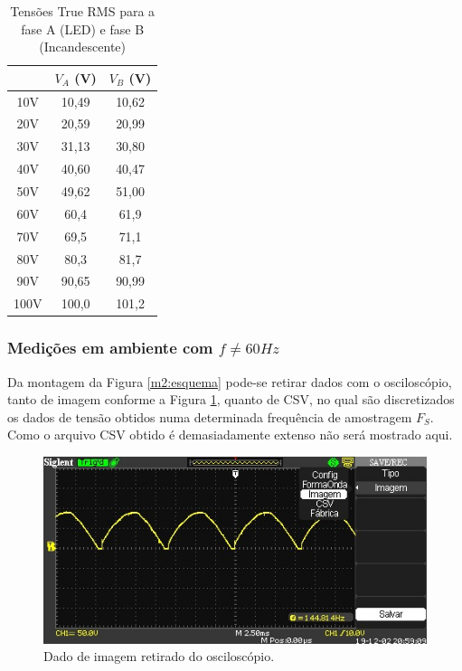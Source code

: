 \documentclass[a4paper,12pt,oneside,openany,table,xcdraw]{article}
\begin{document}
\vspace{0.3cm}
\begin{table}[H]
\centering \small {}
\caption{Tensões True RMS para a fase A (LED) e fase B (Incandescente)}
\label{m1:dados:truerms}
\begin{tabular}{c|c|c|}
\cline{2-3}
 & $V_A$ (V) & $V_B$ (V) \\ \hline
\multicolumn{1}{|c|}{10V} & 10,49 & 10,62 \\ \hline
\multicolumn{1}{|c|}{20V} & 20,59 & 20,99 \\ \hline
\multicolumn{1}{|c|}{30V} & 31,13 & 30,80 \\ \hline
\multicolumn{1}{|c|}{40V} & 40,60 & 40,47 \\ \hline
\multicolumn{1}{|c|}{50V} & 49,62 & 51,00 \\ \hline
\multicolumn{1}{|c|}{60V} & 60,4 & 61,9 \\ \hline
\multicolumn{1}{|c|}{70V} & 69,5 & 71,1 \\ \hline
\multicolumn{1}{|c|}{80V} & 80,3 & 81,7 \\ \hline
\multicolumn{1}{|c|}{90V} & 90,65 & 90,99 \\ \hline
\multicolumn{1}{|c|}{100V} & 100,0 & 101,2 \\ \hline
\end{tabular}
\end{table}
\vspace{0.4cm}

\subsubsection{Medições em ambiente com $f\ne 60Hz$}
Da montagem da Figura \ref{m2:esquema} pode-se retirar dados com o osciloscópio, tanto de imagem conforme a Figura \ref{m2:imagem}, quanto de CSV, no qual são discretizados os dados de tensão obtidos numa determinada frequência de amostragem $F_S$. Como o arquivo CSV obtido é demasiadamente extenso não será mostrado aqui. 

\vspace{1cm}
\begin{figure}[H]
\centering
\includegraphics[width=13cm]{osc001}
\caption{Dado de imagem retirado do osciloscópio.}
\label{m2:imagem}
\end{figure}
\vspace{0.1cm}
 
\end{document}
